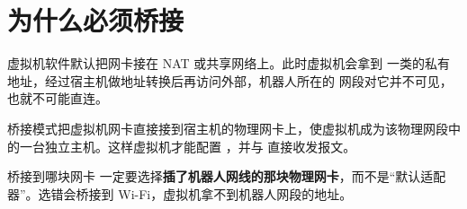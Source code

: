 \section{为什么必须桥接}
\label{sec:why-bridge}
虚拟机软件默认把网卡接在 NAT 或共享网络上。此时虚拟机会拿到  一类的私有地址，经过宿主机做地址转换后再访问外部，机器人所在的  网段对它并不可见，也就不可能直连。

桥接模式把虚拟机网卡直接接到宿主机的物理网卡上，使虚拟机成为该物理网段中的一台独立主机。这样虚拟机才能配置 ，并与  直接收发报文。

\begin{remark}{桥接到哪块网卡}
一定要选择\textbf{插了机器人网线的那块物理网卡}，而不是“默认适配器”。选错会桥接到 Wi-Fi，虚拟机拿不到机器人网段的地址。
\end{remark}
